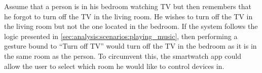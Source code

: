 Assume that a person is in his bedroom watching TV but then remembers that he forgot to turn off the TV in the living room.
He wishes to turn off the TV in the living room but not the one located in the bedroom.
If the system follows the logic presented in \cref{sec:analysis:scenarios:playing_music}, then performing a gesture bound to ``Turn off TV'' would turn off the TV in the bedroom as it is in the same room as the person.
To circumvent this, the smartwatch app could allow the user to select which room he would like to control devices in.

